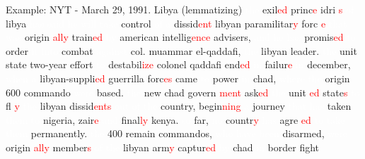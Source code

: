 \documentclass[english]{beamer}
\begin{document}
%
\begin{frame}
{\normalsize{Example: NYT - March 29, 1991. Libya (lemmatizing)}}
\textcolor{white}{the} exil\textcolor{red}{ed} princ\textcolor{red}{e} idri%
\textcolor{red}{s} \textcolor{white}{of} libya \textcolor{white}{has} %
\textcolor{white}{said} \textcolor{white}{he} \textcolor{white}{will} %
\textcolor{white}{take} control \textcolor{white}{of} \textcolor{white}{a}
dissid\textcolor{red}{ent} libyan paramilitar\textcolor{red}{y} forc%
\textcolor{red}{e} \textcolor{white}{that} \textcolor{white}{was} origin%
\textcolor{red}{ally} train\textcolor{red}{ed} \textcolor{white}{by}
american intellig\textcolor{red}{ence} advisers, \textcolor{white}{and} %
\textcolor{white}{he} \textcolor{white}{has} promis\textcolor{red}{ed} %
\textcolor{white}{to} order \textcolor{white}{it} \textcolor{white}{into}
combat \textcolor{white}{against} col. muammar el-qaddafi, %
\textcolor{white}{the} libyan leader. \textcolor{white}{the} unit state
two-year effort \textcolor{white}{to} destabil\textcolor{red}{ize} colonel
qaddafi end\textcolor{red}{ed} \textcolor{white}{in} failur\textcolor{red}{e}
\textcolor{white}{in} december, \textcolor{white}{when} \textcolor{white}{a}
libyan-suppli\textcolor{red}{ed} guerrilla forc\textcolor{red}{es} came %
\textcolor{white}{to} power \textcolor{white}{in} chad, %
\textcolor{white}{where} \textcolor{white}{the} origin 600 commando %
\textcolor{white}{were} based. \textcolor{white}{the} new chad govern%
\textcolor{red}{ment} ask\textcolor{red}{ed} \textcolor{white}{the} unit%
\textcolor{red}{ed} state\textcolor{red}{s} \textcolor{white}{to} fl%
\textcolor{red}{y} \textcolor{white}{the} libyan dissid\textcolor{red}{ents} %
\textcolor{white}{out} \textcolor{white}{of} \textcolor{white}{the} country,
begin\textcolor{red}{ning} \textcolor{white}{a} journey %
\textcolor{white}{that} \textcolor{white}{has} taken \textcolor{white}{them} %
\textcolor{white}{to} nigeria, zair\textcolor{red}{e} \textcolor{white}{and}
final\textcolor{red}{ly} kenya. \textcolor{white}{so} far, %
\textcolor{white}{no} countr\textcolor{red}{y} \textcolor{white}{has} agre%
\textcolor{red}{ed} \textcolor{white}{to} \textcolor{white}{take} %
\textcolor{white}{them} permanently. \textcolor{white}{the} 400 remain
commandos, \textcolor{white}{who} \textcolor{white}{have} %
\textcolor{white}{been} disarmed, \textcolor{white}{were} origin%
\textcolor{red}{ally} member\textcolor{red}{s} \textcolor{white}{of} %
\textcolor{white}{the} libyan arm\textcolor{red}{y} captur\textcolor{red}{ed}
\textcolor{white}{by} chad \textcolor{white}{in} border fight%

\end{frame}
\end{document}
